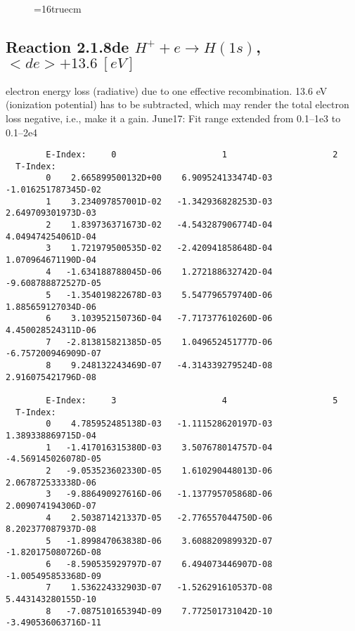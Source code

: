 \documentclass[12pt,dvipdfmx]{article}
\begin{document}
\begin{figure} \label{2.1.8rtot}
\epsfxsize=16truecm
\end{figure}
\newpage



\subsection{
  Reaction 2.1.8de $H^+  + e \rightarrow H(1s) $, \  $<de> + 13.6 \ [eV] $
}

  electron energy loss (radiative) due to one effective recombination.
  13.6 eV (ionization potential) has to be
  subtracted, which may render the total electron loss negative, i.e., make it a gain.
  June17: Fit range extended from 0.1--1e3 to 0.1--2e4

\begin{small}\begin{verbatim}
        E-Index:     0                     1                     2
  T-Index:
        0    2.665899500132D+00    6.909524133474D-03   -1.016251787345D-02
        1    3.234097857001D-02   -1.342936828253D-03    2.649709301973D-03
        2    1.839736371673D-02   -4.543287906774D-04    4.049474254061D-04
        3    1.721979500535D-02   -2.420941858648D-04    1.070964671190D-04
        4   -1.634188788045D-06    1.272188632742D-04   -9.608788872527D-05
        5   -1.354019822678D-03    5.547796579740D-06    1.885659127034D-06
        6    3.103952150736D-04   -7.717377610260D-06    4.450028524311D-06
        7   -2.813815821385D-05    1.049652451777D-06   -6.757200946909D-07
        8    9.248132243469D-07   -4.314339279524D-08    2.916075421796D-08

        E-Index:     3                     4                     5
  T-Index:
        0    4.785952485138D-03   -1.111528620197D-03    1.389338869715D-04
        1   -1.417016315380D-03    3.507678014757D-04   -4.569145026078D-05
        2   -9.053523602330D-05    1.610290448013D-06    2.067872533338D-06
        3   -9.886490927616D-06   -1.137795705868D-06    2.009074194306D-07
        4    2.503871421337D-05   -2.776557044750D-06    8.202377087937D-08
        5   -1.899847063838D-06    3.608820989932D-07   -1.820175080726D-08
        6   -8.590535929797D-07    6.494073446907D-08   -1.005495853368D-09
        7    1.536224332903D-07   -1.526291610537D-08    5.443143280155D-10
        8   -7.087510165394D-09    7.772501731042D-10   -3.490536063716D-11


\end{verbatim}
\end{small}
\end{document}
